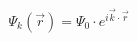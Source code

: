 \documentclass[preview]{standalone}
\begin{document}
\begin{align*}
\Psi_k(\vec{r}) = \Psi_0 \cdot e^{i \vec{k} \cdot \vec{r}}
\end{align*}
\end{document}
